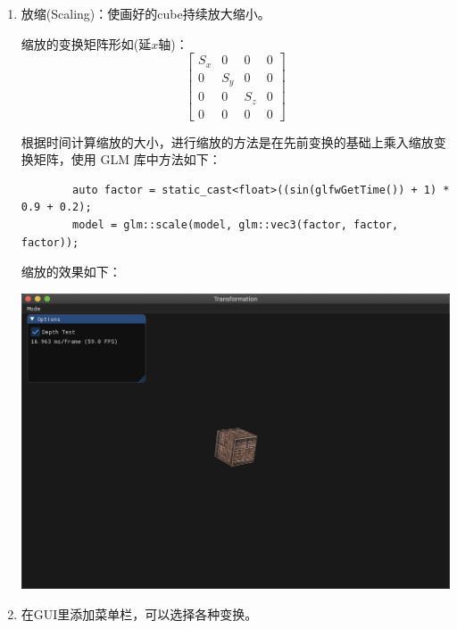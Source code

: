 \documentclass[12pt]{article}
\begin{document}
\begin{enumerate}
    \item 放缩(Scaling)：使画好的cube持续放大缩小。
    
    缩放的变换矩阵形如(延$x$轴)：
    \begin{equation}
    \begin{bmatrix}
        S_x & 0 & 0 & 0\\
        0 & S_y & 0 & 0\\
        0 & 0 & S_z & 0\\ 
        0 & 0 & 0 & 0
    \end{bmatrix}
    \end{equation}

    根据时间计算缩放的大小，进行缩放的方法是在先前变换的基础上乘入缩放变换矩阵，使用 GLM 库中方法如下：
    \begin{lstlisting}
        auto factor = static_cast<float>((sin(glfwGetTime()) + 1) * 0.9 + 0.2);
        model = glm::scale(model, glm::vec3(factor, factor, factor));
    \end{lstlisting}
    缩放的效果如下：
    \begin{center}
        \includegraphics[scale=0.4]{scaling.png}
    \end{center}

    \item 在GUI里添加菜单栏，可以选择各种变换。


\end{enumerate}
\end{document}
